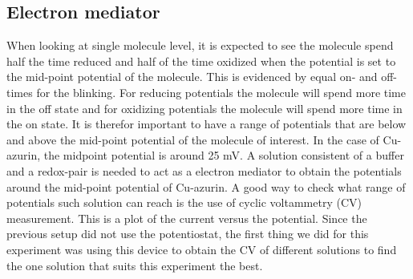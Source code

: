 \documentclass[twoside,single]{lion-msc}
\begin{document}
\subsection{Electron mediator}\label{ferriferro}
When looking at single molecule level, it is expected to see the molecule spend half the time reduced and half of the time oxidized when the potential is set to the mid-point potential of the molecule. This  is evidenced by equal on- and off-times for the blinking. For reducing potentials the molecule will spend more time in the off state and for oxidizing potentials the molecule will spend more time in the on state. It is therefor important to have a range of potentials that are below and above the mid-point potential of the molecule of interest. In the case of Cu-azurin, the midpoint potential is around 25 mV. A solution consistent of a buffer and a redox-pair is needed to act as a electron mediator to obtain the potentials around the mid-point potential of Cu-azurin. A good way to check what range of potentials such solution can reach is the use of cyclic voltammetry (CV) measurement. This is a plot of the current versus the potential. Since the previous setup did not use the potentiostat, the first thing we did for this experiment was using this device to obtain the CV of different solutions to find the one solution that suits this experiment the best.
\end{document}
